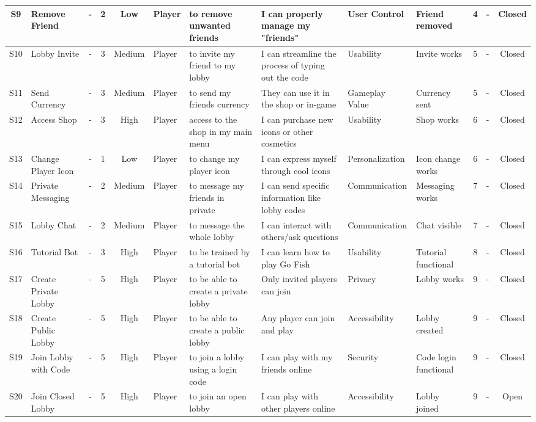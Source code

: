 \begin{table}[h]
{\begin{tabular}{|c|p{2.5cm}|c|c|c|p{3cm}|p{3cm}|p{3cm}|p{3cm}|p{2.5cm}|c|p{2.5cm}|c|}
S9 & Remove Friend & - & 2 & Low & Player & to remove unwanted friends & I can properly manage my "friends" & User Control & Friend removed & 4 & - & Closed \\ \hline
S10 & Lobby Invite & - & 3 & Medium & Player & to invite my friend to my lobby & I can streamline the process of typing out the code & Usability & Invite works & 5 & - & Closed \\ \hline
S11 & Send Currency & - & 3 & Medium & Player & to send my friends currency & They can use it in the shop or in-game & Gameplay Value & Currency sent & 5 & - & Closed \\ \hline
S12 & Access Shop & - & 3 & High & Player & access to the shop in my main menu & I can purchase new icons or other cosmetics & Usability & Shop works & 6 & - & Closed \\ \hline
S13 & Change Player Icon & - & 1 & Low & Player & to change my player icon & I can express myself through cool icons & Personalization & Icon change works & 6 & - & Closed \\ \hline
S14 & Private Messaging & - & 2 & Medium & Player & to message my friends in private & I can send specific information like lobby codes & Communication & Messaging works & 7 & - & Closed \\ \hline
S15 & Lobby Chat & - & 2 & Medium & Player & to message the whole lobby & I can interact with others/ask questions & Communication & Chat visible & 7 & - & Closed \\ \hline
S16 & Tutorial Bot & - & 3 & High & Player & to be trained by a tutorial bot & I can learn how to play Go Fish & Usability & Tutorial functional & 8 & - & Closed \\ \hline
S17 & Create Private Lobby & - & 5 & High & Player & to be able to create a private lobby & Only invited players can join & Privacy & Lobby works & 9 & - & Closed \\ \hline
S18 & Create Public Lobby & - & 5 & High & Player & to be able to create a public lobby & Any player can join and play & Accessibility & Lobby created & 9 & - & Closed \\ \hline
S19 & Join Lobby with Code & - & 5 & High & Player & to join a lobby using a login code & I can play with my friends online & Security & Code login functional & 9 & - & Closed \\ \hline
S20 & Join Closed Lobby & - & 5 & High & Player & to join an open lobby & I can play with other players online & Accessibility & Lobby joined & 9 & - & Open \\ \hline

\end{tabular}}
\end{table}
